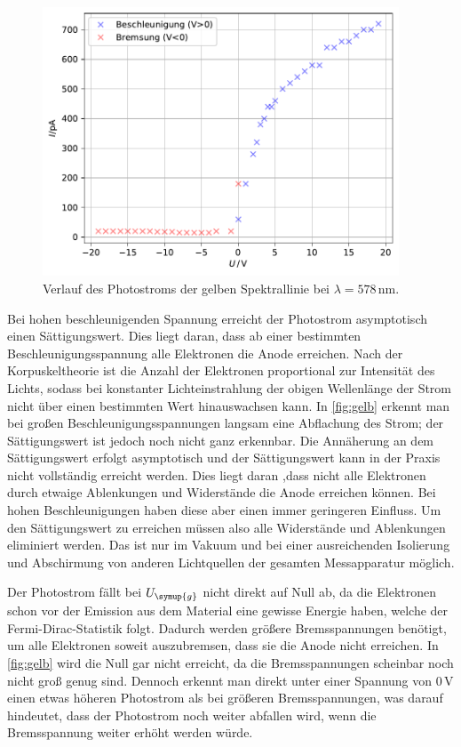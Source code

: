     
\begin{figure}
    \centering
    \includegraphics[height = 8cm]{build/plotgelb.pdf}
    \caption{Verlauf des Photostroms der gelben Spektrallinie bei $\lambda = 578 \,\unit{\nm}$.}
    \label{fig:gelb}
\end{figure}
Bei hohen beschleunigenden Spannung erreicht der Photostrom asymptotisch einen Sättigungswert. Dies liegt daran, dass ab einer bestimmten
Beschleunigungsspannung alle Elektronen die Anode erreichen. Nach der Korpuskeltheorie ist die Anzahl der Elektronen proportional zur Intensität 
des Lichts, sodass bei konstanter Lichteinstrahlung der obigen Wellenlänge der Strom nicht über einen bestimmten Wert hinauswachsen kann. In 
\autoref{fig:gelb} erkennt man bei großen Beschleunigungsspannungen langsam eine Abflachung des Strom; der Sättigungswert ist jedoch noch nicht ganz erkennbar.
Die Annäherung an dem Sättigungswert erfolgt asymptotisch und der Sättigungswert kann in der Praxis nicht vollständig erreicht werden. Dies liegt daran ,dass 
nicht alle Elektronen durch etwaige Ablenkungen und Widerstände die Anode erreichen können. Bei hohen Beschleunigungen haben diese aber einen immer geringeren 
Einfluss. Um den Sättigungswert zu erreichen müssen also alle Widerstände und Ablenkungen eliminiert werden. Das ist nur im Vakuum und bei einer ausreichenden 
Isolierung und Abschirmung von anderen Lichtquellen der  gesamten Messapparatur möglich.

Der Photostrom fällt bei $U_{\symup{g}}$ nicht direkt auf Null ab, da die Elektronen schon vor der Emission aus dem Material eine gewisse Energie 
haben, welche der Fermi-Dirac-Statistik folgt. Dadurch werden größere Bremsspannungen benötigt, um alle Elektronen soweit auszubremsen, dass sie die 
Anode nicht erreichen. In \autoref{fig:gelb} wird die Null gar nicht erreicht, da die Bremsspannungen scheinbar noch nicht groß genug sind. Dennoch erkennt 
man direkt unter einer Spannung von $0\,\unit{\volt}$ einen etwas höheren Photostrom als bei größeren Bremsspannungen, was darauf hindeutet, dass 
der Photostrom noch weiter abfallen wird, wenn die Bremsspannung weiter erhöht werden würde.

